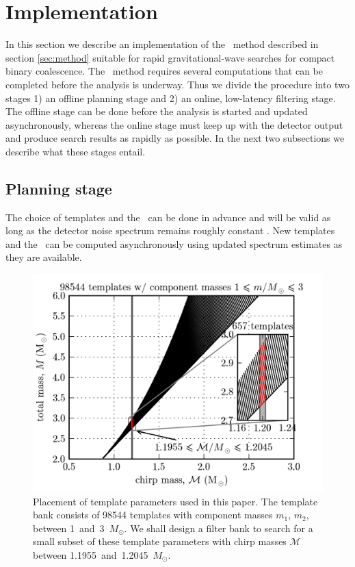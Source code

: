 \section{Implementation}
\label{sec:implementation}

In this section we describe an implementation of the \lloid\ method described
in section \ref{sec:method} suitable for rapid gravitational-wave
searches for compact binary coalescence.  The \lloid\ method requires several
computations that can be completed before the analysis is underway.  Thus
we divide the procedure into two stages 1) an offline planning stage and 2) an
online, low-latency filtering stage.  The offline stage can be done before the
analysis is started and updated asynchronously, whereas the online stage must
keep up with the detector output and produce search results as rapidly as
possible.  In the next two subsections we describe what these stages entail.

\subsection{Planning stage}

The choice of templates and the \SVD\ can be done in
advance and will be valid as long as the detector noise spectrum remains
roughly constant%
%
.  New templates and the \SVD\ can be computed asynchronously using
updated spectrum estimates as they are available. 

\begin{figure}[htbp]
	\label{fig:tmpltbank}
	\begin{center}
		\includegraphics{figures/tmpltbank.png}
		\caption{Placement of template parameters used in this paper.  The template bank consists of 98544 templates with component masses $m_1$, $m_2$, between 1~and~3~$M_\odot$.  We shall design a filter bank to search for a small subset of these template parameters with chirp masses $\mathcal M$ between 1.1955~and~1.2045~$M_\odot$.}
	\end{center}
\end{figure}

